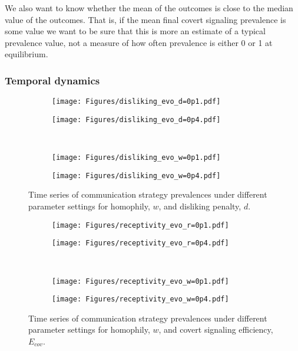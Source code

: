 \documentclass[11pt,letterpaper]{article}
\begin{document}
We also want to know whether the mean of the outcomes is close to the
median value of the outcomes. That is, if the mean
final covert signaling prevalence is some value we want to be sure that
this is more an estimate of a typical prevalence value, not a measure of 
how often prevalence is either 0 or 1 at equilibrium.

\subsubsection{Temporal dynamics}

\begin{figure}[H]
  \centering
  \begin{subfigure}{0.49\textwidth}
    \texttt{[image: Figures/disliking\_evo\_d=0p1.pdf]}
  \caption{}
  \end{subfigure}
  \begin{subfigure}{0.49\textwidth}
    \texttt{[image: Figures/disliking\_evo\_d=0p4.pdf]}
  \caption{}
  \end{subfigure} \\
  \begin{subfigure}{0.49\textwidth}
    \texttt{[image: Figures/disliking\_evo\_w=0p1.pdf]}
  \caption{}
  \end{subfigure}
  \begin{subfigure}{0.49\textwidth}
    \texttt{[image: Figures/disliking\_evo\_w=0p4.pdf]}
  \caption{}
  \end{subfigure}
  \caption{Time series of communication strategy prevalences under different parameter settings
  for homophily, $w$, and disliking penalty, $d$.}
  \label{fig:}
\end{figure}

\begin{figure}[H]
  \centering
  \begin{subfigure}{0.49\textwidth}
    \texttt{[image: Figures/receptivity\_evo\_r=0p1.pdf]}
  \caption{}
  \end{subfigure}
  \begin{subfigure}{0.49\textwidth}
    \texttt{[image: Figures/receptivity\_evo\_r=0p4.pdf]}
  \caption{}
  \end{subfigure} \\
  \begin{subfigure}{0.49\textwidth}
    \texttt{[image: Figures/receptivity\_evo\_w=0p1.pdf]}
  \caption{}
  \end{subfigure}
  \begin{subfigure}{0.49\textwidth}
    \texttt{[image: Figures/receptivity\_evo\_w=0p4.pdf]}
  \caption{}
  \end{subfigure}
  \caption{Time series of communication strategy prevalences under different parameter settings
  for homophily, $w$, and covert signaling efficiency, $E_{cov}$.}
  \label{fig:}
\end{figure}
\end{document}
